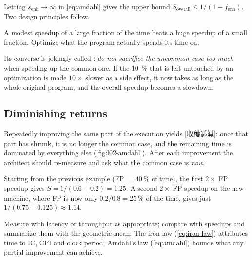 \documentclass[../main.tex]{subfiles}
\begin{document}
Letting $s_{\mathrm{enh}} \to \infty$ in \cref{eq:amdahl} gives the upper
bound $S_{\mathrm{overall}} \le 1/(1-f_{\mathrm{enh}})$.  Two design
principles follow.

\begin{keypoint}
  A modest speedup of a large fraction of the time beats a huge speedup of
  a small fraction.  Optimize what the program actually spends its time on.
\end{keypoint}

Its converse is jokingly called
:
\emph{do not sacrifice the uncommon case too much} when speeding up the
common one.  If the \SI{10}{\percent} that is left untouched by an
optimization is made $10\times$ slower as a side effect, it now takes as
long as the whole original program, and the overall speedup becomes a
slowdown.

\subsection{Diminishing returns}

Repeatedly improving the same part of the execution yields
[収穫逓減]: once that part has shrunk, it is no
longer the common case, and the remaining time is dominated by everything
else (\cref{fig:l02-amdahl}).  After each improvement the architect should
re-measure and ask what the common case is \emph{now}.

\begin{example}
  Starting from the previous example (FP $=\SI{40}{\percent}$ of time),
  the first $2\times$ FP speedup gives $S = 1/(0.6+0.2) =
  1.25$.  A second
  $2\times$ FP speedup on the new machine, where FP is now only
  $0.2/0.8 = \SI{25}{\percent}$ of the time, gives just
  $1/(0.75+0.125) \approx 1.14$.
\end{example}

\begin{keypoint}
  Measure with latency or throughput as appropriate; compare with speedups
  and summarize them with the geometric mean.  The iron law
  (\cref{eq:iron-law}) attributes time to IC, CPI and clock period; Amdahl's
  law (\cref{eq:amdahl}) bounds what any partial improvement can achieve.
\end{keypoint}

\begin{marginfigure}
  \resizebox{\linewidth}{!}{}
  \caption{Overall speedup $S$ for $f_{\mathrm{enh}} = 0.4$ as the enhanced
    part gets faster.  Each further improvement of the same part buys less.}
  \label{fig:l02-amdahl}
\end{marginfigure}
\end{document}
